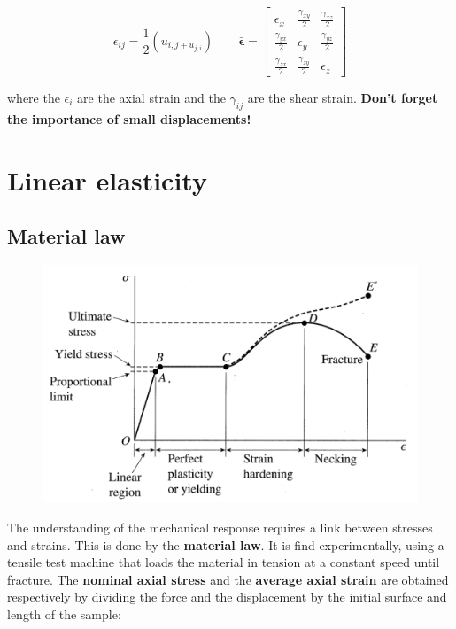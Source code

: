 			\begin{equation}
			\epsilon _{ij}= \frac{1}{2} (u_{i,j + u_{j,i}})\qquad \bm{\bar{ \bar{\epsilon}}} = 
			\left[
			\begin{array}{ccc}
			\epsilon _x &\frac{\gamma _{xy}}{2} &\frac{\gamma _{xz}}{2} \\
			\frac{\gamma _{yx}}{2} & \epsilon _y & \frac{\gamma _{yz}}{2}\\
			\frac{\gamma _{zx}}{2} & \frac{\gamma _{zy}}{2} & \epsilon _z
			\end{array}						
			\right]
			\end{equation}
			
			where the $\epsilon _i$ are the axial strain and the $\gamma _{ij}$ are the shear strain. \textbf{Don't forget the importance of small displacements!}
			
	\section{Linear elasticity}
		\subsection{Material law}
			\begin{figure}
			\vspace{-5mm}	
			\includegraphics[scale=0.3]{ch3/6}
			\label{fig:3.6}
			\end{figure}		
			The understanding of the mechanical response requires a link between stresses and strains. This is done by the \textbf{material law}. It is find experimentally, using a tensile test machine that loads the material in tension at a constant speed until fracture. The \textbf{nominal axial stress} and the \textbf{average axial strain} are obtained respectively by dividing the force and the displacement by the initial surface and length of the sample:
			
